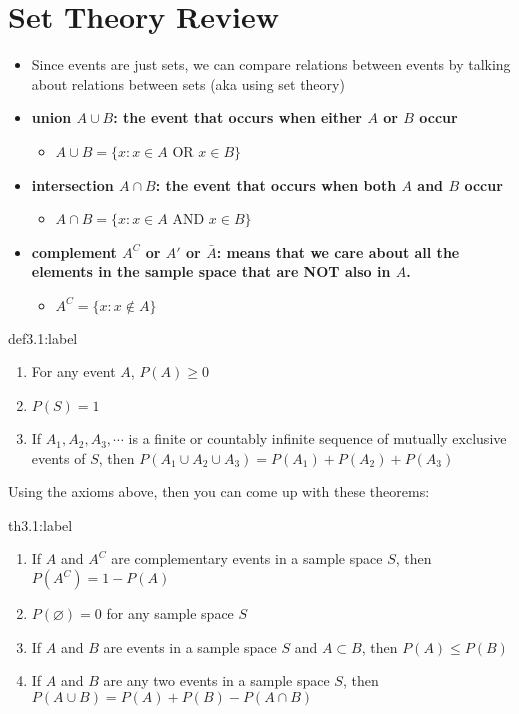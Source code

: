 \section{Set Theory Review}

\begin{itemize}
    \item Since events are just sets, we can compare relations between events by talking about relations between sets (aka using set theory)
    \item \bf{union $A \cup B$:} the event that occurs when either $A$ or $B$ occur
    \begin{itemize}
        \item $A \cup B = \{x : x \in A $ OR $x \in B\}$
    \end{itemize}
    \item \bf{intersection $A \cap B$:} the event that occurs when both $A$ and $B$ occur
    \begin{itemize}
        \item $A \cap B = \{x : x \in A $ AND $x \in B\}$
    \end{itemize}
    \item \bf{complement $A^C$ or $A'$ or $\bar A$:} means that we care about all the elements in the sample space that are NOT also in $A$. 
    \begin{itemize}
        \item $A^C = \{x : x \notin A\}$
    \end{itemize}
\end{itemize}

\begin{definition}{def3.1:label}
    \begin{enumerate}
        \item For any event $A$, $P(A) \ge 0$
        \item $P(S) = 1$
        \item If $A_1, A_2, A_3, \cdots$ is a finite or countably infinite sequence of mutually exclusive events of $S$, then $P(A_1 \cup A_2 \cup A_3) = P(A_1)+P(A_2)+P(A_3)$
    \end{enumerate}
\end{definition}

Using the axioms above, then you can come up with these theorems:

\begin{theorem}{th3.1:label}
    \begin{enumerate}
        \item If $A$ and $A^C$ are complementary events in a sample space $S$, then $P(A^C) = 1 - P(A)$
        \item $P(\varnothing) = 0$ for any sample space $S$
        \item If $A$ and $B$ are events in a sample space $S$ and $A \subset B$, then $P(A) \le P(B)$
        \item If $A$ and $B$ are any two events in a sample space $S$, then $P(A \cup B) = P(A) + P(B) - P(A \cap B)$
    \end{enumerate}
\end{theorem}


